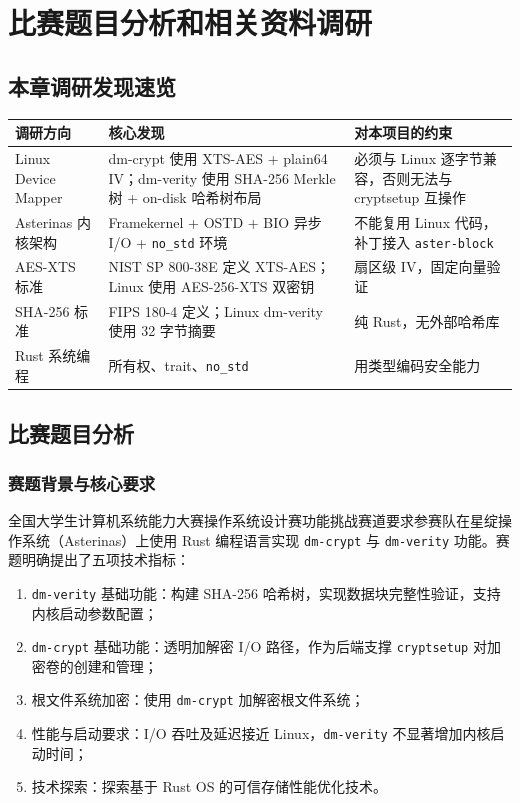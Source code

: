 \chapter{比赛题目分析和相关资料调研}

\section*{本章调研发现速览}

\begin{table}[H]
    \centering
    \begin{tabular}{p{}p{}p{}}
        \toprule
        \textbf{调研方向} & \textbf{核心发现} & \textbf{对本项目的约束} \\
        \midrule
        Linux Device Mapper & dm-crypt 使用 XTS-AES + plain64 IV；dm-verity 使用 SHA-256 Merkle 树 + on-disk 哈希树布局 & 必须与 Linux 逐字节兼容，否则无法与 cryptsetup 互操作 \\
        Asterinas 内核架构 & Framekernel + OSTD + BIO 异步 I/O + \texttt{no\_std} 环境 & 不能复用 Linux 代码，补丁接入 \texttt{aster-block} \\
        AES-XTS 标准 & NIST SP 800-38E 定义 XTS-AES；Linux 使用 AES-256-XTS 双密钥 & 扇区级 IV，固定向量验证 \\
        SHA-256 标准 & FIPS 180-4 定义；Linux dm-verity 使用 32 字节摘要 & 纯 Rust，无外部哈希库 \\
        Rust 系统编程 & 所有权、trait、\texttt{no\_std} & 用类型编码安全能力 \\
        \bottomrule
    \end{tabular}
\end{table}

\section{比赛题目分析}

\subsection{赛题背景与核心要求}

全国大学生计算机系统能力大赛操作系统设计赛功能挑战赛道要求参赛队在星绽操作系统（Asterinas）上使用 Rust 编程语言实现 \texttt{dm-crypt} 与 \texttt{dm-verity} 功能。赛题明确提出了五项技术指标：

\begin{enumerate}
    \item \texttt{dm-verity} 基础功能：构建 SHA-256 哈希树，实现数据块完整性验证，支持内核启动参数配置；
    \item \texttt{dm-crypt} 基础功能：透明加解密 I/O 路径，作为后端支撑 \texttt{cryptsetup} 对加密卷的创建和管理；
    \item 根文件系统加密：使用 \texttt{dm-crypt} 加解密根文件系统；
    \item 性能与启动要求：I/O 吞吐及延迟接近 Linux，\texttt{dm-verity} 不显著增加内核启动时间；
    \item 技术探索：探索基于 Rust OS 的可信存储性能优化技术。
\end{enumerate}

